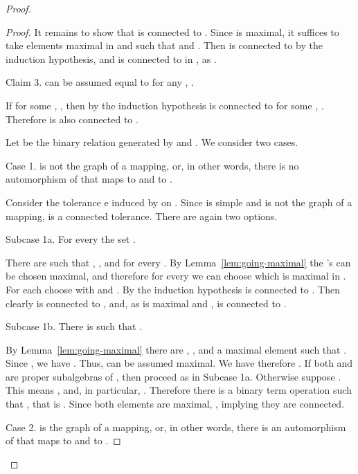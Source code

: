 \documentclass[11pt]{article}
\begin{document}
\begin{proof}
\begin{proof}
It remains to show that  is connected to . Since  is maximal, it suffices 
to take elements  maximal in  and such that  and 
. Then  is connected to  by the induction hypothesis, and  
is connected to  in , as .

\smallskip

{\sc Claim 3.}
 can be assumed equal to  for any , .

\smallskip

If  for some , , then by the 
induction hypothesis  is connected to  for some , . 
Therefore  is also connected to .

\smallskip

Let  be the binary relation generated by  and . We consider two cases.

\smallskip

{\sc Case 1.}
 is not the graph of a mapping, or, in other words, there is no automorphism of  that 
maps  to  and  to .

\smallskip

Consider the tolerance e induced by  on . Since  is simple and  is not the graph of a mapping,  is a connected  tolerance. There are again two options.

\smallskip

{\sc Subcase 1a.}
For every  the set .

\smallskip

There are  such that , , and 
 for every . By 
Lemma~\ref{lem:going-maximal} the 's can be chosen maximal, 
and therefore for every  we can choose  which is 
maximal in . For each  choose  with  
and . By the induction hypothesis  is connected to . Then clearly 
 is connected to , and, as  is maximal and ,  is 
connected to .

\smallskip

{\sc Subcase 1b.}
There is  such that .

\smallskip

By Lemma~\ref{lem:going-maximal} there are , , and a maximal 
element  such that . Since , we have 
. Thus,  can be assumed maximal. We have therefore 
. If both  and  are proper 
subalgebras of , then proceed as in Subcase 1a. Otherwise suppose 
. This means , and, in particular, . 
Therefore there is a binary term operation  such that , that 
is . Since both elements are maximal, , implying they are connected.

\smallskip

{\sc Case 2.}
 is the graph of a mapping, or, in other words, there is an automorphism of 
 that maps  to  and  to .


\end{proof}
\end{proof}
\end{document}
